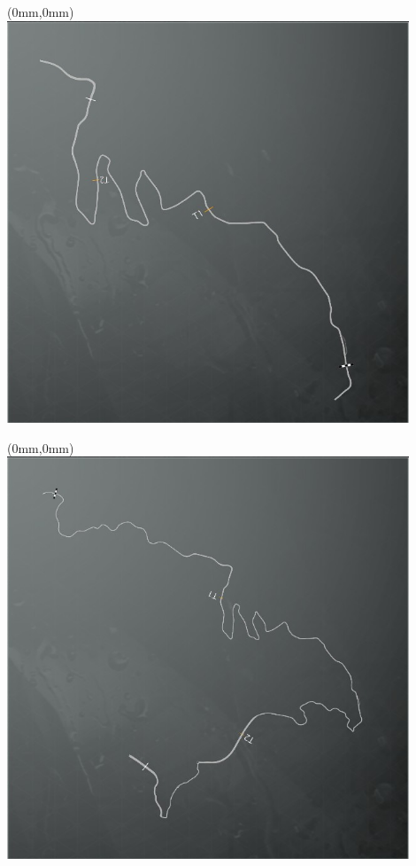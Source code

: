 \null\newpage
\begin{textblock*}{30mm}(0mm,0mm)%
\includegraphics[width=120mm]{TR/2015-05-20_00004.png}
\end{textblock*}
\null\newpage
\begin{textblock*}{30mm}(0mm,0mm)%
\includegraphics[width=120mm]{TR/2015-05-20_00006.png}
\end{textblock*}
